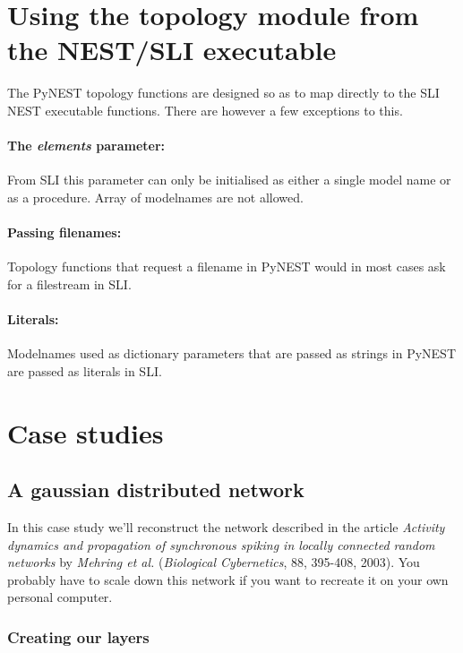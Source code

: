 \documentclass{article}
\begin{document}
\section{Using the topology module from the NEST/SLI executable}

The PyNEST topology functions are designed so as to map directly to the SLI NEST executable functions. There are however a few exceptions to this.

\paragraph{The \emph{elements} parameter:} From SLI this parameter can only be initialised as either a single model name or as a procedure. Array of modelnames are not allowed.

\paragraph{Passing filenames:} Topology functions that request a filename in PyNEST would in most cases ask for a filestream in SLI.

\paragraph{Literals:} Modelnames used as dictionary parameters that are passed as strings in PyNEST are passed as literals in SLI.

\section{Case studies}

\subsection{A gaussian distributed network}

In this case study we'll reconstruct the network described in the article \emph{Activity dynamics and propagation of synchronous spiking in locally connected random networks} by \emph{Mehring et al.} (\emph{Biological Cybernetics}, 88, 395-408, 2003). You probably have to scale down this network if you want to recreate it on your own personal computer.

\subsubsection{Creating our layers}
\end{document}
